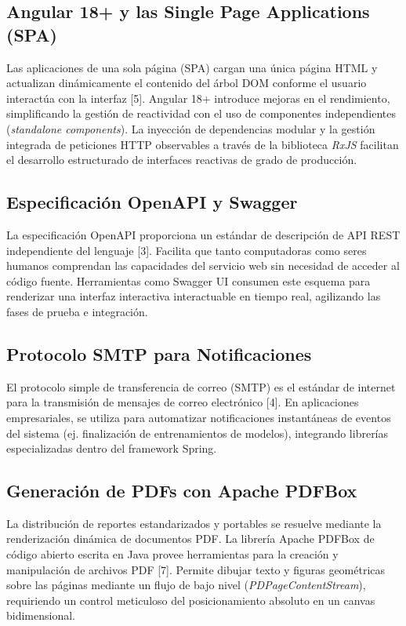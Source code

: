 \subsection{Angular 18+ y las Single Page Applications (SPA)}
Las aplicaciones de una sola página (SPA) cargan una única página HTML y actualizan dinámicamente el contenido del árbol DOM conforme el usuario interactúa con la interfaz [5]. Angular 18+ introduce mejoras en el rendimiento, simplificando la gestión de reactividad con el uso de componentes independientes (\textit{standalone components}). La inyección de dependencias modular y la gestión integrada de peticiones HTTP observables a través de la biblioteca \textit{RxJS} facilitan el desarrollo estructurado de interfaces reactivas de grado de producción.

\subsection{Especificación OpenAPI y Swagger}
La especificación OpenAPI proporciona un estándar de descripción de API REST independiente del lenguaje [3]. Facilita que tanto computadoras como seres humanos comprendan las capacidades del servicio web sin necesidad de acceder al código fuente. Herramientas como Swagger UI consumen este esquema para renderizar una interfaz interactiva interactuable en tiempo real, agilizando las fases de prueba e integración.

\subsection{Protocolo SMTP para Notificaciones}
El protocolo simple de transferencia de correo (SMTP) es el estándar de internet para la transmisión de mensajes de correo electrónico [4]. En aplicaciones empresariales, se utiliza para automatizar notificaciones instantáneas de eventos del sistema (ej. finalización de entrenamientos de modelos), integrando librerías especializadas dentro del framework Spring.

\subsection{Generación de PDFs con Apache PDFBox}
La distribución de reportes estandarizados y portables se resuelve mediante la renderización dinámica de documentos PDF. La librería Apache PDFBox de código abierto escrita en Java provee herramientas para la creación y manipulación de archivos PDF [7]. Permite dibujar texto y figuras geométricas sobre las páginas mediante un flujo de bajo nivel (\textit{PDPageContentStream}), requiriendo un control meticuloso del posicionamiento absoluto en un canvas bidimensional.

